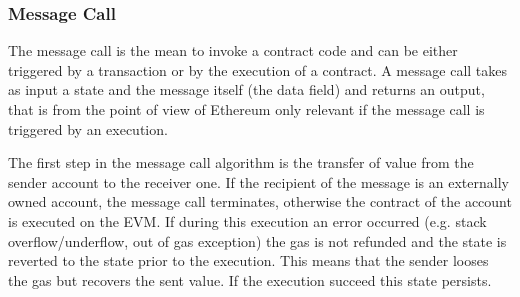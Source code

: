 \subsubsection{Message Call}
The message call is the mean to invoke a contract code and can be either
triggered by a transaction or by the execution of a contract.
A message call takes as input a state and the message itself (the data field)
and returns an output, that is from the point of view of Ethereum only 
relevant if the message call is triggered by an execution.

The first step in the message call algorithm is the transfer of value from the
sender account to the receiver one. If the recipient of the message is
an externally owned account, the message call terminates, otherwise the contract
of the account is executed on the EVM. 
If during this execution an error occurred (e.g. stack overflow/underflow,
out of gas exception) the gas is not refunded and the state is reverted 
to the state prior to the execution. This means that the sender
looses the gas but recovers the sent value. If the execution succeed this state
persists.